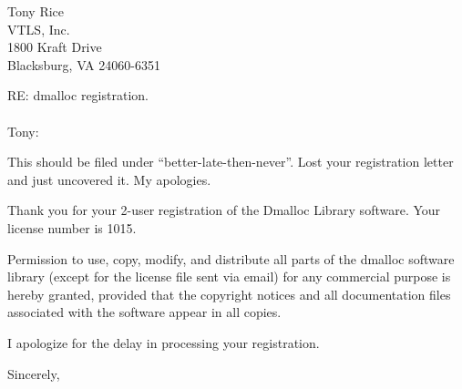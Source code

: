 

%
%

%
%
\address{Dmalloc Software \\
826 Savannah Ave. \\
Pittsburgh, PA  15221-3446 \\
1.412.244.8827}

\signature{Gray Watson \\
gray@letters.com}

\date{February 10, 1998}


\begin{letter}{Tony Rice \\
VTLS, Inc. \\
1800 Kraft Drive \\
Blacksburg, VA  24060-6351}

\opening{RE: dmalloc registration. \\
 \\
Tony:}

This should be filed under ``better-late-then-never''.  Lost your
registration letter and just uncovered it.  My apologies.

Thank you for your 
2-user registration of the Dmalloc Library software.  Your license
number is
1015.

Permission to use, copy, modify, and distribute all parts of the
dmalloc software library (except for the license file sent via email)
for any commercial purpose is hereby granted, provided that the
copyright notices and all documentation files associated with the
software appear in all copies.

I apologize for the delay in processing your registration.

\closing{Sincerely,}

\end{letter}

